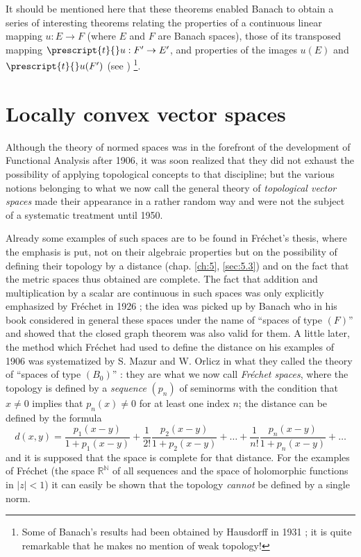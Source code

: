 \documentclass[12pt,a4paper,leqno,twoside]{extbook}
\newcommand{\R}{\mathbb{R}}
\newcommand{\N}{\mathbb{N}}
\begin{document}
It should be mentioned here that these theorems enabled Banach to obtain a series of interesting theorems relating the properties of a continuous linear mapping \(u: E \to F\) (where \(E\) and \(F\) are Banach spaces), those of its transposed mapping \(\prescript{t}{}u: F' \to E'\), and properties of the images \(u(E)\) and \(\prescript{t}{}u(F')\) (see \cite{051}) \footnote{Some of Banach's results had been obtained by Hausdorff in 1931 \cite{102}; it is quite remarkable that he makes no mention of weak topology!}.

\section{Locally convex vector spaces}
\label{sec:8.2}

Although the theory of normed spaces was in the forefront of the development of Functional Analysis after 1906, it was soon realized that they did not exhaust the possibility of applying topological concepts to that discipline; but the various notions belonging to what we now call the general theory of \emph{topological vector spaces} made their appearance in a rather random way and were not the subject of a systematic treatment until 1950.

Already some examples of such spaces are to be found in Fréchet's thesis, where the emphasis is put, not on their algebraic properties but on the possibility of defining their topology by a distance (chap. \ref{ch:5}, \ref{sec:5.3}) and on the fact that the metric spaces thus obtained are complete. The fact that addition and multiplication by a scalar are continuous in such spaces was only explicitly emphasized by Fréchet in 1926 \cite{073}; the idea was picked up by Banach who in his book considered in general these spaces under the name of ``spaces of type \((F)\)'' and showed that the closed graph theorem was also valid for them. A little later, the method which Fréchet had used to define the distance on his examples of 1906 was systematized by S. Mazur and W. Orlicz in what they called the theory of ``spaces of type \((B_0)\)'' \cite{160}: they are what we now call \emph{Fréchet spaces}, where the topology is defined by a \emph{sequence} \((p_n)\) of seminorms with the condition that \(x \neq 0\) implies that \(p_n(x) \neq 0\) for at least one index \(n\); the distance can be defined by the formula
\[
    d(x,y) = \frac{p_1(x-y)}{1 + p_1(x-y)} + \frac{1}{2!}\frac{p_2(x-y)}{1 + p_2(x-y)} + \ldots + \frac{1}{n!}\frac{p_n(x-y)}{1 + p_n(x-y)} + \ldots
\]
and it is supposed that the space is complete for that distance. For the examples of Fréchet (the space \(\R^{\N}\) of all sequences and the space of holomorphic functions in \(|z| < 1\)) it can easily be shown that the topology \emph{cannot} be defined by a single norm.
\end{document}
